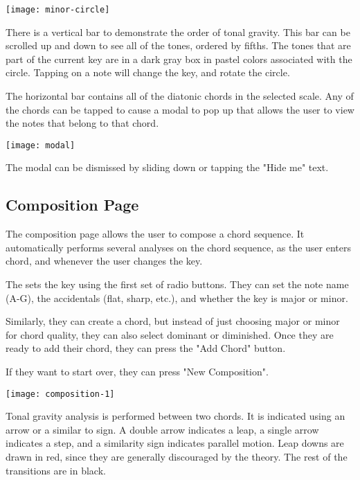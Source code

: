 \documentclass[onecolumn, draftclsnofoot,10pt, compsoc]{IEEEtran}
\begin{document}
\begin{center}
\texttt{[image: minor-circle]}
\end{center}

There is a vertical bar to demonstrate the order of tonal gravity.
This bar can be scrolled up and down to see all of the tones, ordered by fifths.
The tones that are part of the current key are in a dark gray box in pastel colors associated with the circle.
Tapping on a note will change the key, and rotate the circle.

The horizontal bar contains all of the diatonic chords in the selected scale.
Any of the chords can be tapped to cause a modal to pop up that allows the user to view the notes that belong to that chord.

\begin{center}
\texttt{[image: modal]}
\end{center}

The modal can be dismissed by sliding down or tapping the "Hide me" text.

\subsection{Composition Page}

The composition page allows the user to compose a chord sequence.
It automatically performs several analyses on the chord sequence, as the user enters chord, and whenever the user changes the key.

The sets the key using the first set of radio buttons.
They can set the note name (A-G), the accidentals (flat, sharp, etc.), and whether the key is major or minor.

Similarly, they can create a chord, but instead of just choosing major or minor for chord quality, they can also select dominant or diminished.
Once they are ready to add their chord, they can press the "Add Chord" button.

If they want to start over, they can press "New Composition".

\begin{center}
\texttt{[image: composition-1]}
\end{center}

Tonal gravity analysis is performed between two chords.
It is indicated using an arrow or a similar to sign.
A double arrow indicates a leap, a single arrow indicates a step, and a similarity sign indicates parallel motion.
Leap downs are drawn in red, since they are generally discouraged by the theory.
The rest of the transitions are in black.
\end{document}
